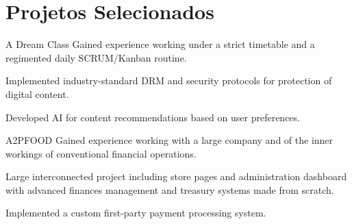 \section{Projetos Selecionados}

\begin{experience}{A Dream Class}{
}
Gained experience working under a strict timetable and a regimented daily SCRUM/Kanban routine.

\begin{contribs}
	\item{Implemented industry-standard DRM and security protocols for protection of digital content.}
	\item{Developed AI for content recommendations based on user preferences.}
\end{contribs}
\end{experience}

\begin{experience}{A2PFOOD}{
}
Gained experience working with a large company and of the inner workings of conventional financial operations.

\begin{contribs}
	\item{Large interconnected project including store pages and administration dashboard with advanced finances management and treasury systems made from scratch.}
	\item{Implemented a custom first-party payment processing system.}
\end{contribs}
\end{experience}
